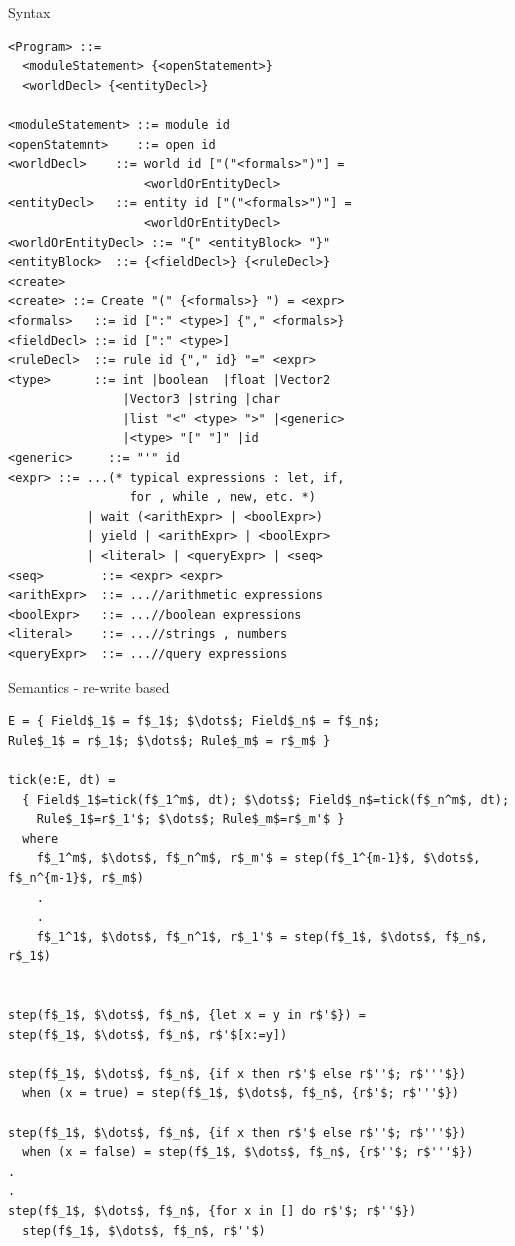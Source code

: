 \documentclass{beamer}
\begin{document}
\begin{frame}[fragile]{Syntax}
\tiny	
\begin{lstlisting}[showstringspaces=false]
<Program> ::=
  <moduleStatement> {<openStatement>}
  <worldDecl> {<entityDecl>}

<moduleStatement> ::= module id
<openStatemnt>    ::= open id
<worldDecl>    ::= world id ["("<formals>")"] =
                   <worldOrEntityDecl>
<entityDecl>   ::= entity id ["("<formals>")"] =
                   <worldOrEntityDecl>
<worldOrEntityDecl> ::= "{" <entityBlock> "}"
<entityBlock>  ::= {<fieldDecl>} {<ruleDecl>}
<create>
<create> ::= Create "(" {<formals>} ") = <expr>
<formals>   ::= id [":" <type>] {"," <formals>}
<fieldDecl> ::= id [":" <type>]
<ruleDecl>  ::= rule id {"," id} "=" <expr>
<type>      ::= int |boolean  |float |Vector2
                |Vector3 |string |char
                |list "<" <type> ">" |<generic>
                |<type> "[" "]" |id
<generic>     ::= "'" id
<expr> ::= ...(* typical expressions : let, if,
                 for , while , new, etc. *)
           | wait (<arithExpr> | <boolExpr>)
           | yield | <arithExpr> | <boolExpr>
           | <literal> | <queryExpr> | <seq>
<seq>        ::= <expr> <expr>
<arithExpr>  ::= ...//arithmetic expressions
<boolExpr>   ::= ...//boolean expressions
<literal>    ::= ...//strings , numbers
<queryExpr>  ::= ...//query expressions
\end{lstlisting}
\end{frame}

\begin{frame}[fragile]{Semantics - re-write based}
\tiny	
\begin{lstlisting}[showstringspaces=false]
E = { Field$_1$ = f$_1$; $\dots$; Field$_n$ = f$_n$;
Rule$_1$ = r$_1$; $\dots$; Rule$_m$ = r$_m$ }

tick(e:E, dt) =
  { Field$_1$=tick(f$_1^m$, dt); $\dots$; Field$_n$=tick(f$_n^m$, dt);
    Rule$_1$=r$_1'$; $\dots$; Rule$_m$=r$_m'$ }
  where
    f$_1^m$, $\dots$, f$_n^m$, r$_m'$ = step(f$_1^{m-1}$, $\dots$, f$_n^{m-1}$, r$_m$)
    .
    .
    f$_1^1$, $\dots$, f$_n^1$, r$_1'$ = step(f$_1$, $\dots$, f$_n$, r$_1$)


step(f$_1$, $\dots$, f$_n$, {let x = y in r$'$}) =
step(f$_1$, $\dots$, f$_n$, r$'$[x:=y])

step(f$_1$, $\dots$, f$_n$, {if x then r$'$ else r$''$; r$'''$})
  when (x = true) = step(f$_1$, $\dots$, f$_n$, {r$'$; r$'''$})

step(f$_1$, $\dots$, f$_n$, {if x then r$'$ else r$''$; r$'''$})
  when (x = false) = step(f$_1$, $\dots$, f$_n$, {r$''$; r$'''$})
.
.
step(f$_1$, $\dots$, f$_n$, {for x in [] do r$'$; r$''$})
  step(f$_1$, $\dots$, f$_n$, r$''$)
\end{lstlisting}
\end{frame}
\end{document}
